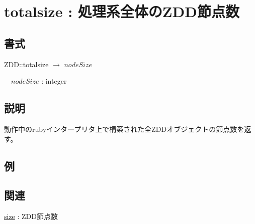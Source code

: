 
\section{totalsize : 処理系全体のZDD節点数\label{sect:totalsize}}
\subsection*{書式}
ZDD::totalsize $\rightarrow$ $nodeSize$

~~$nodeSize$ : integer

\subsection*{説明}
動作中のrubyインタープリタ上で構築された全ZDDオブジェクトの節点数を返す。

\subsection*{例}


\subsection*{関連}
\hyperref[sect:size]{size} : ZDD節点数


